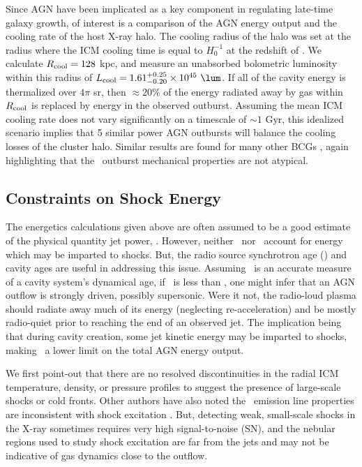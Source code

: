 \documentclass[useAMS,usenatbib]{mn2e}
\begin{document}
Since AGN have been implicated as a key component in regulating
late-time galaxy growth, of interest is a comparison of the AGN energy
output and the cooling rate of the host X-ray halo. The cooling radius
of the halo was set at the radius where the ICM cooling time is equal
to $H_0^{-1}$ at the redshift of \irs. We calculate $R_{\rm{cool}} =
128$ kpc, and measure an unabsorbed bolometric luminosity within this
radius of $L_{\rm{cool}} = 1.61^{+0.25}_{-0.20} \times 10^{45}
~\lum$. If all of the cavity energy is thermalized over $4\pi$ sr,
then $\approx 20\%$ of the energy radiated away by gas within
$R_{\rm{cool}}$ is replaced by energy in the observed
outburst. Assuming the mean ICM cooling rate does not vary
significantly on a timescale of $\sim 1$ Gyr, this idealized scenario
implies that 5 similar power AGN outbursts will balance the cooling
losses of the cluster halo. Similar results are found for many other
BCGs \citep[\eg][]{rafferty06}, again highlighting that the
\irs\ outburst mechanical properties are not atypical.

\subsection{Constraints on Shock Energy}

The energetics calculations given above are often assumed to be a good
estimate of the physical quantity jet power, \pjet. However, neither
\pcav\ nor \pjet\ account for energy which may be imparted to shocks.
But, the radio source synchrotron age (\tsync) and cavity ages are
useful in addressing this issue. Assuming \tsync\ is an accurate
measure of a cavity system's dynamical age, if \tsync\ is less than
\tsonic, one might infer that an AGN outflow is strongly driven,
possibly supersonic. Were it not, the radio-loud plasma should radiate
away much of its energy (neglecting re-acceleration) and be mostly
radio-quiet prior to reaching the end of an observed jet. The
implication being that during cavity creation, some jet kinetic energy
may be imparted to shocks, making \ecav\ a lower limit on the total
AGN energy output.

We first point-out that there are no resolved discontinuities in the
radial ICM temperature, density, or pressure profiles to suggest the
presence of large-scale shocks or cold fronts. Other authors have also
noted the \irs\ emission line properties are inconsistent with shock
excitation \citep{1996MNRAS.283.1003C, 2000AJ....120..562T}. But,
detecting weak, small-scale shocks in the X-ray sometimes requires
very high signal-to-noise (SN), and the nebular regions used to study
shock excitation are far from the jets and may not be indicative of
gas dynamics close to the outflow.
\end{document}
